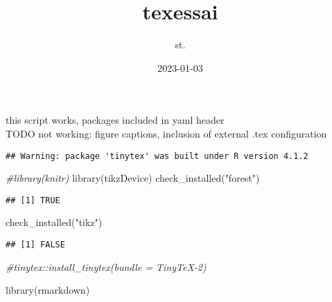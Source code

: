 \documentclass[
]{article}
\title{texessai}
\author{st.}
\date{2023-01-03}
\newenvironment{Shaded}{\begin{snugshade}}{\end{snugshade}}
\newcommand{\AttributeTok}[1]{\textcolor[rgb]{0.77,0.63,0.00}{#1}}
\newcommand{\CommentTok}[1]{\textcolor[rgb]{0.56,0.35,0.01}{\textit{#1}}}
\newcommand{\ConstantTok}[1]{\textcolor[rgb]{0.00,0.00,0.00}{#1}}
\newcommand{\FunctionTok}[1]{\textcolor[rgb]{0.00,0.00,0.00}{#1}}
\newcommand{\NormalTok}[1]{#1}
\newcommand{\SpecialCharTok}[1]{\textcolor[rgb]{0.00,0.00,0.00}{#1}}
\newcommand{\StringTok}[1]{\textcolor[rgb]{0.31,0.60,0.02}{#1}}
\begin{document}
\maketitle

this script works, packages included in yaml header\\
TODO not working: figure captions, inclusion of external .tex
configuration

\begin{Shaded}
\end{Shaded}

\begin{verbatim}
## Warning: package 'tinytex' was built under R version 4.1.2
\end{verbatim}

\begin{Shaded}
\begin{Highlighting}[]
\CommentTok{\#library(knitr)}
\FunctionTok{library}\NormalTok{(tikzDevice)}
\FunctionTok{check\_installed}\NormalTok{(}\StringTok{"forest"}\NormalTok{)}
\end{Highlighting}
\end{Shaded}

\begin{verbatim}
## [1] TRUE
\end{verbatim}

\begin{Shaded}
\begin{Highlighting}[]
\FunctionTok{check\_installed}\NormalTok{(}\StringTok{"tikz"}\NormalTok{)}
\end{Highlighting}
\end{Shaded}

\begin{verbatim}
## [1] FALSE
\end{verbatim}

\begin{Shaded}
\begin{Highlighting}[]
\CommentTok{\#tinytex::install\_tinytex(bundle = \textquotesingle{}TinyTeX{-}2\textquotesingle{})}


\FunctionTok{library}\NormalTok{(rmarkdown)}
\end{Highlighting}
\end{Shaded}
\end{document}
